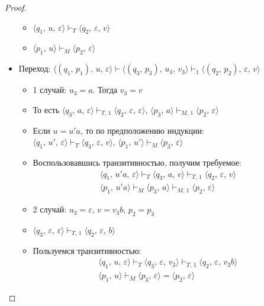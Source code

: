 \documentclass[a4paper,12pt]{article}
\theoremstyle{plain}
\theoremstyle{definition}
\theoremstyle{remark}
\begin{document}
\begin{proof}
\begin{itemize}
\begin{itemize}
			      \item $\langle q_1,\,u,\,\varepsilon\rangle\vdash_T\langle q_2,\,\varepsilon,\,v\rangle$
			      \item $\langle p_1,\,u\rangle\vdash_M\langle p_2,\,\varepsilon\rangle$
		      \end{itemize}
		\item Переход: $\langle(q_1,\,p_1),\,u,\,\varepsilon\rangle\vdash\langle(q_3,\,p_3),\,u_3,\,v_3\rangle\vdash_1\langle(q_2,\,p_2),\,\varepsilon,\,v\rangle$
		      \begin{itemize}
			      \item 1 случай: $u_3 = a$. Тогда $v_3 = v$
			      \item То есть $\langle q_3,\,a,\,\varepsilon\rangle\vdash_{T,\,1}\langle q_2,\,\varepsilon,\,\varepsilon\rangle,\,\langle p_3,\,a\rangle\vdash_{M,\,1}\langle p_2,\,\varepsilon\rangle$
			      \item Если $u = u'a$, то по предположению индукции: $\langle q_1,\,u',\,\varepsilon\rangle\vdash_T\langle q_3,\,\varepsilon,\,v\rangle,\,\langle p_1,\,u'\rangle\vdash_M\langle p_3,\,\varepsilon\rangle$
			      \item Воспользовавшись транзитивностью, получим требуемое:
			            \begin{align*}
				            \langle q_1,\,u'a,\,\varepsilon\rangle\vdash_T\langle q_3,\,a,\,v\rangle\vdash_{T,\,1}\langle q_2,\,\varepsilon,\,v\rangle \\
				            \langle p_1,\,u'a\rangle\vdash_M\langle p_3,\,a\rangle\vdash_{M,\,1}\langle p_2,\,\varepsilon\rangle
			            \end{align*}
			      \item 2 случай: $u_3 = \varepsilon,\,v = v_3b,\, p_2 = p_3$
			      \item $\langle q_3,\,\varepsilon,\,\varepsilon\rangle\vdash_{T,\,1}\langle q_2,\,\varepsilon,\,b\rangle$
			      \item Пользуемся транзитивностью:
			            \begin{align*}
				            \langle q_1,\,u,\,\varepsilon\rangle\vdash_T\langle q_3,\,\varepsilon,\,v_3\rangle\vdash_{T,\,1}\langle q_2,\,\varepsilon,\, v_3b\rangle \\
				            \langle p_1,\,u\rangle\vdash_M\langle p_3,\,\varepsilon\rangle=\langle p_2,\,\varepsilon\rangle
			            \end{align*}
		      \end{itemize}
	\end{itemize}

\end{proof}
\end{document}
